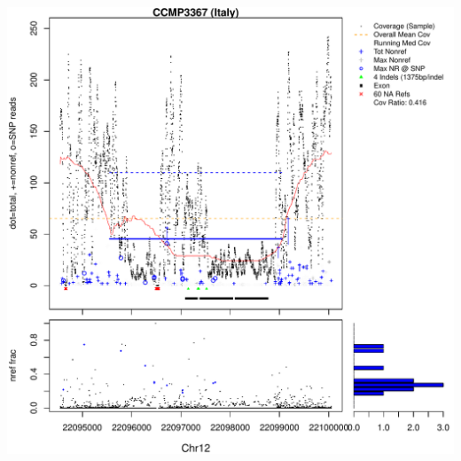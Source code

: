 \documentclass{article}\usepackage[]{graphicx}\usepackage[]{color}
\makeatletter
\def\maxwidth{ %
  \ifdim\Gin@nat@width>\linewidth
    \linewidth
  \else
    \Gin@nat@width
  \fi
}
\newenvironment{knitrout}{}{} %
\makeatother
\begin{document}
\begin{knitrout}
{\includegraphics[width=\maxwidth]{figs-knitr/unnamed-chunk-55-7} 

}



\end{knitrout}
\end{document}
